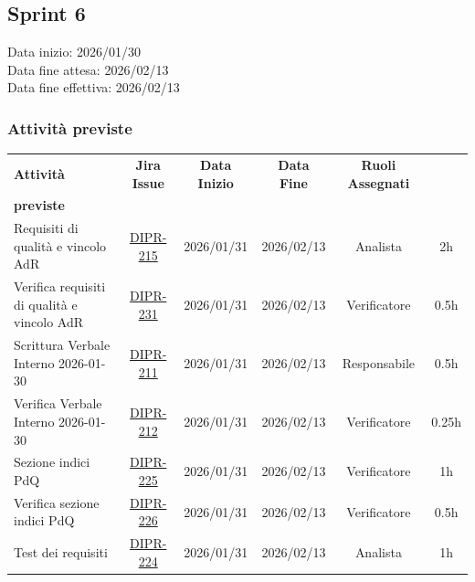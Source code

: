 \documentclass[a4paper,12pt]{article}
\begin{document}
\newpage

\subsection{Sprint 6}
Data inizio: 2026/01/30\\
Data fine attesa: 2026/02/13\\
Data fine effettiva: 2026/02/13

\subsubsection{Attività previste}
\small
{}
    \begin{longtable}{|p{4cm}|c|c|c|c|c|}
        \hline
        \rowcolor{zpusgreen!30}
        \textbf{Attività} & \textbf{Jira Issue} & \textbf{Data Inizio} & \textbf{Data Fine} & \textbf{Ruoli Assegnati} & \begin{tabular}[c]{@{}c@{}} \textbf{Ore} \\ \textbf{previste} \end{tabular} \\
        \hline
        Requisiti di qualità e vincolo AdR & \href{https://7zpus.atlassian.net/browse/DIPR-215}{DIPR-215} & 2026/01/31 & 2026/02/13 & Analista & 2h \\
        \hline
        Verifica requisiti di qualità e vincolo AdR & \href{https://7zpus.atlassian.net/browse/DIPR-231}{DIPR-231} & 2026/01/31 & 2026/02/13 & Verificatore & 0.5h \\
        \hline
        Scrittura Verbale Interno 2026-01-30 & \href{https://7zpus.atlassian.net/browse/DIPR-211}{DIPR-211} & 2026/01/31 & 2026/02/13 & Responsabile & 0.5h \\
        \hline
        Verifica Verbale Interno 2026-01-30 & \href{https://7zpus.atlassian.net/browse/DIPR-212}{DIPR-212} & 2026/01/31 & 2026/02/13 & Verificatore & 0.25h \\
        \hline
        Sezione indici PdQ & \href{https://7zpus.atlassian.net/browse/DIPR-225}{DIPR-225} & 2026/01/31 & 2026/02/13 & Verificatore & 1h \\
        \hline
        Verifica sezione indici PdQ & \href{https://7zpus.atlassian.net/browse/DIPR-226}{DIPR-226} & 2026/01/31 & 2026/02/13 & Verificatore & 0.5h \\
        \hline
        Test dei requisiti & \href{https://7zpus.atlassian.net/browse/DIPR-224}{DIPR-224} & 2026/01/31 & 2026/02/13 & Analista & 1h \\

\end{longtable}
\end{document}

